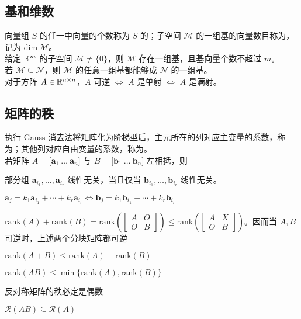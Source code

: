 \documentclass[./main.tex]{subfiles}
\begin{document}
\subsection{基和维数}
向量组 $S$ 的任一中向量的个数称为 $S$ 的；子空间 $\mathcal{M}$ 的一组基的向量数目称为，记为 $\mathrm{dim}\ \mathcal{M}$。\\

给定 $\mathbb{R}^{m}$ 的子空间 $\mathcal{M}\neq\{0\}$，则 $\mathcal{M}$ 存在一组基，且基向量个数不超过 $m$。\\

若 $\mathcal{M}\subseteq\mathcal{N}$，则 $\mathcal{M}$ 的任意一组基都能够成 $\mathcal{N}$ 的一组基。\\

对于方阵 $A\in\mathbb{R}^{n\times n}$，$A$ 可逆 $\iff$ $A$ 是单射 $\iff$ $A$ 是满射。

\subsection{矩阵的秩}
执行 Gauss 消去法将矩阵化为阶梯型后，主元所在的列对应主变量的系数，称为；其他列对应自由变量的系数，称为。\\

若矩阵 $A=\big[\bm{a}_1\ \dots\ \bm{a}_n\big]$ 与 $B=\big[\bm{b}_1\ \dots\ \bm{b}_n\big]$ 左相抵，则

\begin{enumerate*}
    \item 部分组 $\bm{a}_{i_1},\dots,\bm{a}_{i_r}$ 线性无关，当且仅当 $\bm{b}_{i_1},\dots,\bm{b}_{i_r}$ 线性无关。
    \item $\bm{a}_j=k_1\bm{a}_{i_1}+\cdots+k_r\bm{a}_{i_r}\iff\bm{b}_j=k_1\bm{b}_{i_1}+\cdots+k_r\bm{b}_{i_r}$
\end{enumerate*}

\begin{itemize*}
    \item $\mathrm{rank}(A)+\mathrm{rank}(B)=\mathrm{rank}\left(\begin{bmatrix}A &O\\ O &B\end{bmatrix}\right)\le\mathrm{rank}\left(\begin{bmatrix}A &X\\ O &B\end{bmatrix}\right)$。因而当 $A,B$ 可逆时，上述两个分块矩阵都可逆
    \item $\mathrm{rank}(A+B)\le\mathrm{rank}(A)+\mathrm{rank}(B)$
    \item $\mathrm{rank}(AB)\le\min\{\mathrm{rank}(A),\mathrm{rank}(B)\}$
    \item 反对称矩阵的秩必定是偶数
    \item $\mathcal{R}(AB)\subseteq\mathcal{R}(A)$
\end{itemize*}
\end{document}
